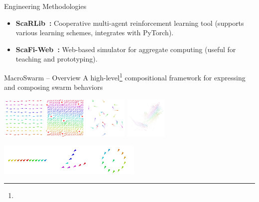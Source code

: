 \documentclass[presentation, 9pt,169]{beamer}\mode<presentation>{\usetheme{AMSBolognaFC}}
\begin{document}
\begin{frame}[fragile]{Engineering Methodologies}
\begin{enumerate}
  \end{enumerate}

  
  \begin{itemize}
  \item \textbf{ScaRLib~\cite{domini2023scarlib}:} Cooperative multi-agent reinforcement learning tool (supports various learning schemes, integrates with PyTorch).
  \item \textbf{ScaFi-Web~\cite{aguzzi2021scafi}:} Web-based simulator for aggregate computing (useful for teaching and prototyping).
  \end{itemize}
  
\end{frame}
\begin{frame}[fragile]{MacroSwarm -- Overview}
\large{
A high-level\footnote{\tiny{}} compositional framework for expressing and composing swarm behaviors
}
\begin{center}
  \includegraphics[height=2cm]{img/constant-movement.png}
  \includegraphics[height=2cm]{img/obstracle.png}		
  \includegraphics[height=2cm]{img/explore-2.png}
  \includegraphics[height=2cm]{img/flock.png}
\end{center}
\begin{center}
  \includegraphics[height=1.5cm]{img/shapes.png}
\end{center}

\end{frame}
\end{document}
